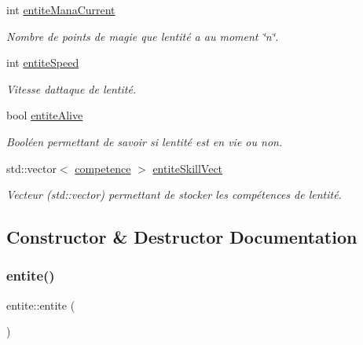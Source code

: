 \begin{DoxyCompactItemize}
int \hyperlink{classentite_ae194ea6eb360db3882fc0559a144899b}{entite\+Mana\+Current}
\begin{DoxyCompactList}\small\item\em Nombre de points de magie que l\textquotesingle{}entité a au moment \char`\"{}n\char`\"{}. \end{DoxyCompactList}\item 
int \hyperlink{classentite_ad9df70a9bb07f07b3ebf520941c3a35f}{entite\+Speed}
\begin{DoxyCompactList}\small\item\em Vitesse d\textquotesingle{}attaque de l\textquotesingle{}entité. \end{DoxyCompactList}\item 
bool \hyperlink{classentite_a5a69c21a4435817f2d960e0811d4474e}{entite\+Alive}
\begin{DoxyCompactList}\small\item\em Booléen permettant de savoir si l\textquotesingle{}entité est en vie ou non. \end{DoxyCompactList}\item 
std\+::vector$<$ \hyperlink{classcompetence}{competence} $>$ \hyperlink{classentite_ad9d38b74abc49ec4fba0fcb27f4edaa9}{entite\+Skill\+Vect}
\begin{DoxyCompactList}\small\item\em Vecteur ({\ttfamily std\+::vector}) permettant de stocker les compétences de l\textquotesingle{}entité. \end{DoxyCompactList}\end{DoxyCompactItemize}


\subsection{Constructor \& Destructor Documentation}
\mbox{\label{classentite_a41b83303ba28a228fdfad7de3eed40fe}} 
\subsubsection{\texorpdfstring{entite()}{entite()}\hspace{0.1cm}{\footnotesize\ttfamily [1/2]}}
{\footnotesize\ttfamily entite\+::entite (\begin{DoxyParamCaption}{ }\end{DoxyParamCaption})}



